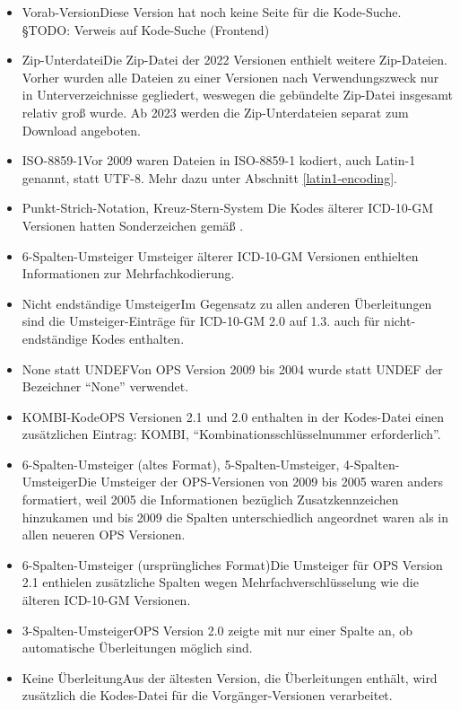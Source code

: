 \begin{itemize}
\item Vorab-Version\newline Diese Version hat noch keine Seite für die Kode-Suche. {\color{blue} §TODO: Verweis auf Kode-Suche (Frontend)}
\item Zip-Unterdatei\newline Die Zip-Datei der 2022 Versionen enthielt weitere Zip-Dateien. Vorher wurden alle Dateien zu einer Versionen nach Verwendungszweck nur in Unterverzeichnisse gegliedert, weswegen die gebündelte Zip-Datei insgesamt relativ groß wurde. Ab 2023 werden die Zip-Unterdateien separat zum Download angeboten.
\item ISO-8859-1\newline Vor 2009 waren Dateien in ISO-8859-1 kodiert, auch Latin-1 genannt, statt UTF-8. Mehr dazu unter Abschnitt \ref{latin1-encoding}.
\item Punkt-Strich-Notation, Kreuz-Stern-System \newline Die Kodes älterer ICD-10-GM Versionen hatten Sonderzeichen gemäß \citep{bfarmicdkk}.
\item 6-Spalten-Umsteiger \newline Umsteiger älterer ICD-10-GM Versionen enthielten Informationen zur Mehrfachkodierung. 
\item Nicht endständige Umsteiger\newline Im Gegensatz zu allen anderen Überleitungen sind die Umsteiger-Einträge für ICD-10-GM 2.0 auf 1.3. auch für nicht-endständige Kodes enthalten. 
\item None statt UNDEF\newline Von OPS Version 2009 bis 2004 wurde statt UNDEF der Bezeichner "`None"' verwendet. 
\item KOMBI-Kode\newline OPS Versionen 2.1 und 2.0 enthalten in der Kodes-Datei einen zusätzlichen Eintrag: KOMBI, "`Kombinationsschlüsselnummer erforderlich"'. 
\item 6-Spalten-Umsteiger (altes Format), 5-Spalten-Umsteiger, 4-Spalten-Umsteiger\newline Die Umsteiger der OPS-Versionen von 2009 bis 2005 waren anders formatiert, weil 2005 die Informationen bezüglich Zusatzkennzeichen hinzukamen und bis 2009 die Spalten unterschiedlich angeordnet waren als in allen neueren OPS Versionen. 
\item 6-Spalten-Umsteiger (ursprüngliches Format)\newline Die Umsteiger für OPS Version 2.1 enthielen zusätzliche Spalten wegen Mehrfachverschlüsselung wie die älteren ICD-10-GM Versionen. 
\item 3-Spalten-Umsteiger\newline OPS Version 2.0 zeigte mit nur einer Spalte an, ob automatische Überleitungen möglich sind. 
\item Keine Überleitung\newline Aus der ältesten Version, die Überleitungen enthält, wird zusätzlich die Kodes-Datei für die Vorgänger-Versionen verarbeitet.
\end{itemize}

